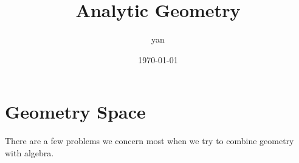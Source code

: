 \documentclass{book}
\title{Analytic Geometry}
\author{yan}
\date{\today}
\begin{document}
\frontmatter
\maketitle
\tableofcontents

\mainmatter

\chapter{Geometry Space}
There are a few problems we concern most when we try to combine geometry with algebra.
\end{document}
